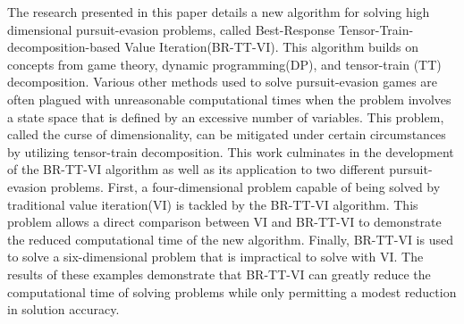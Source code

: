 % 
% 
%
The research presented in this paper details a new algorithm for solving high dimensional pursuit-evasion problems, called Best-Response Tensor-Train-decomposition-based Value Iteration(BR-TT-VI). This algorithm builds on concepts from game theory, dynamic programming(DP), and tensor-train (TT) decomposition.
Various other methods used to solve pursuit-evasion games are often plagued with unreasonable computational times when the problem involves a state space that is defined by an excessive number of variables. This problem, called the curse of dimensionality, can be mitigated under certain circumstances by utilizing tensor-train decomposition.
This work culminates in the development of the BR-TT-VI algorithm as well as its application to two different pursuit-evasion problems. First, a four-dimensional problem capable of being solved by traditional value iteration(VI) is tackled by the BR-TT-VI algorithm. This problem allows a direct comparison between VI and BR-TT-VI to demonstrate the reduced computational time of the new algorithm. Finally, BR-TT-VI is used to solve a six-dimensional problem that is impractical to solve with VI. The results of these examples demonstrate that BR-TT-VI can greatly reduce the computational time of solving problems while only permitting a modest reduction in solution accuracy.  
